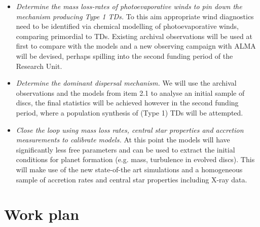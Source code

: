 \documentclass[10pt,fleqn,twoside]{article}
\begin{document}
\begin{itemize}
\item{\it Determine the mass loss-rates of photoevaporative winds
  to pin down the mechanism producing Type 1 TDs.} To
this aim appropriate wind diagnostics need to be identified via
chemical modelling of  photoevaporative winds, comparing primordial to
TDs. Existing archival observations will be used at first to compare
with the models and a new observing campaign with ALMA will be
devised, perhaps spilling into the second funding period of the Research Unit.
\item{\it Determine the dominant dispersal mechanism.} We will
use the archival observations and the models from item 2.1 to analyse
an initial sample of discs, the final statistics will be achieved
however in the second funding period, where a population synthesis of
(Type 1) TDs will be attempted.
\item {\it Close the loop using mass loss rates, central star
  properties and accretion measurements to calibrate models.}  At this
point the models will have significantly less free parameters and can
be used to extract the initial conditions for planet formation
(e.g. mass, turbulence in evolved discs). This will make use of the new state-of-the
art simulations and a homogeneous sample of accretion rates and central
star properties including X-ray data. 
\end{itemize}

\section{Work plan}

\end{document}
